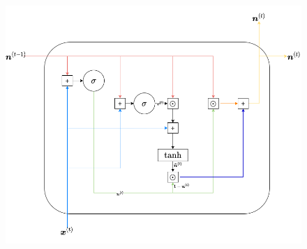 \documentclass[../../main.tex]{subfiles}
\begin{document}
    \begin{figure}[H]
        \centering
        \includegraphics[width=\textwidth]{immagini/6_4/gruSchema.drawio.png}
        \caption{}
        \label{fig:strutturaGRU}
    \end{figure}
\end{document}
